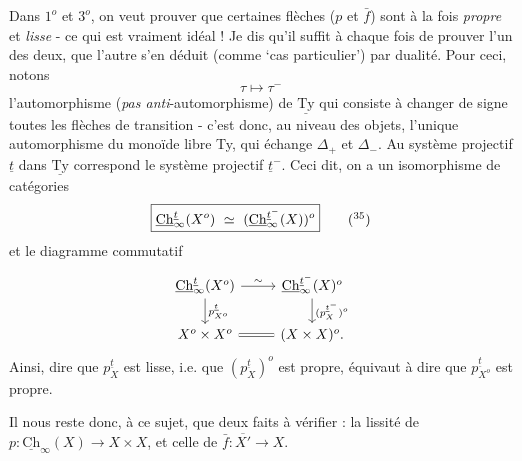 \documentclass[11pt]{article}
\newcommand{\printedpage}[1]{\marginpar{\footnotesize p.~#1}}
\newcommand{\msp}[1]{\marginpar{\footnotesize [#1]}}
\newcommand{\Ch}{\underline{\mathrm{Ch}}}
\newcommand{\Ty}{\underline{\mathrm{Ty}}}
\begin{document}
\printedpage{89}

\msp{page 143}
Dans $1^o$ et $3^o$, on veut prouver que certaines flèches ($p$ et $\bar{f}$) sont à la fois \textit{propre} et \textit{lisse} - ce qui est vraiment idéal ! Je dis qu'il suffit à chaque fois de prouver l'un des deux, que l'autre s'en déduit (comme `cas particulier') par dualité. Pour ceci, notons
\[
\tau \longmapsto \tau^{-}
\]
l'automorphisme (\textit{pas anti}-automorphisme) de $\Ty$ qui consiste à changer de signe toutes les flèches de transition - c'est donc, au niveau des objets, l'unique automorphisme du monoïde libre Ty, qui échange $\Delta_+$ et $\Delta_-$. Au système projectif $\underline{t}$ dans $\Ty$ correspond le système projectif $\underline{t}^-$. Ceci dit, on a un isomorphisme de catégories
\[
\boxed{\Ch^{\underline{t}}_{\infty}(X^o) \ \simeq\ (\Ch^{\underline{t}^-}_{\infty}(X))^o} \tag*{$(^{35})$} %
\]
et le diagramme commutatif
\[
\begin{tikzcd}
\Ch^{\underline{t}}_{\infty}(X^o) \arrow[r, "\sim"] \arrow[d, "p^{\underline{t}}_{X^o}"] & \Ch^{\underline{t}^-}_{\infty}(X)^o \arrow[d, "(p^{\underline{t}^-}_{X})^o"] \\
X^o \times X^o \arrow[r, equal] & (X \times X)^o.
\end{tikzcd}
\]
Ainsi, dire que $p^{\underline{t}}_{X}$ est lisse, i.e. que $(p^{\underline{t}}_{X})^o$ est propre, équivaut à dire que $p^{\underline{t}}_{X^o}$ est propre.

\msp{page 144}
Il nous reste donc, à ce sujet, que deux faits à vérifier : la lissité de $p : \Ch_{\infty}(X) \longrightarrow X \times X$, et celle de $\bar{f} : \overline{X'} \longrightarrow X$.
\end{document}
